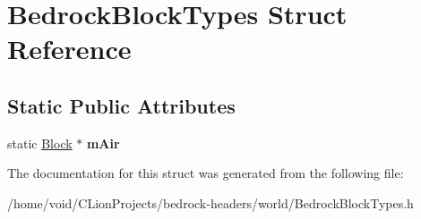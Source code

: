 \hypertarget{struct_bedrock_block_types}{}\section{Bedrock\+Block\+Types Struct Reference}
\label{struct_bedrock_block_types}
\subsection*{Static Public Attributes}
\begin{DoxyCompactItemize}
\item 
\mbox{\label{struct_bedrock_block_types_af6fa4066d20fc852a3297cbb4cb84f43}} 
static \mbox{\hyperlink{struct_block}{Block}} $\ast$ {\bfseries m\+Air}
\end{DoxyCompactItemize}


The documentation for this struct was generated from the following file\+:\begin{DoxyCompactItemize}
\item 
/home/void/\+C\+Lion\+Projects/bedrock-\/headers/world/Bedrock\+Block\+Types.\+h\end{DoxyCompactItemize}

